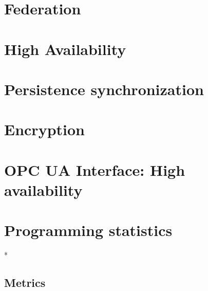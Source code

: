 \section{Federation}\label{sec:res:cluster}

\section{High Availability}\label{sec:res:ha}

\section{Persistence synchronization}\label{sec:res:psync}

\section{Encryption}\label{sec:res:security}

\section{OPC UA Interface: High availability}\label{sec:res:opc-ua}


\section{Programming statistics}
* %
\subsection{Metrics}
